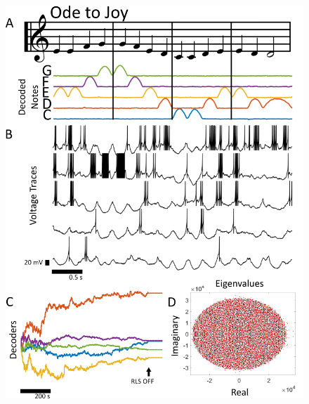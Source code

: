 \documentclass[11pt]{article} %
\begin{document}
\begin{figure}[htp!]
\centering
\includegraphics[scale=0.9]{FFIG3}
\caption{}\label{FORCE4}
\end{figure}
\end{document}
